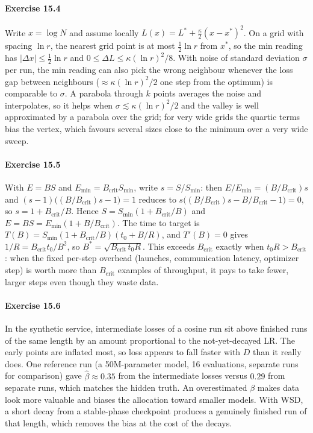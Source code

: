 \paragraph{Exercise 15.4} Write $x=\log N$ and assume locally $L(x)=L^*+\tfrac\kappa2(x-x^*)^2$.
On a grid with spacing $\ln r$, the nearest grid point is at most $\tfrac12\ln r$ from $x^*$, so
the min reading has $|\Delta x|\le\tfrac12\ln r$ and $0\le\Delta L\le\kappa(\ln r)^2/8$. With
noise of standard deviation $\sigma$ per run, the min reading can also pick the wrong neighbour
whenever the loss gap between neighbours ($\approx\kappa(\ln r)^2/2$ one step from the optimum) is
comparable to $\sigma$. A parabola through $k$ points averages the noise and interpolates, so it
helps when $\sigma\lesssim\kappa(\ln r)^2/2$ and the valley is well approximated by a parabola over
the grid; for very wide grids the quartic terms bias the vertex, which favours several sizes close
to the minimum over a very wide sweep.

\paragraph{Exercise 15.5} With $E=BS$ and $E_{\min}=B_{\text{crit}}S_{\min}$, write
$s=S/S_{\min}$: then $E/E_{\min}=(B/B_{\text{crit}})s$ and
$(s-1)\bigl((B/B_{\text{crit}})s-1\bigr)=1$ reduces to
$s\bigl((B/B_{\text{crit}})s-B/B_{\text{crit}}-1\bigr)=0$, so $s=1+B_{\text{crit}}/B$. Hence
$S=S_{\min}(1+B_{\text{crit}}/B)$ and $E=BS=E_{\min}(1+B/B_{\text{crit}})$. The time to target is
$T(B)=S_{\min}(1+B_{\text{crit}}/B)(t_0+B/R)$, and $T'(B)=0$ gives $1/R=B_{\text{crit}}t_0/B^2$, so
$B^*=\sqrt{B_{\text{crit}}\,t_0R}$. This exceeds $B_{\text{crit}}$ exactly when $t_0R>B_{\text{crit}}$:
when the fixed per-step overhead (launches, communication latency, optimizer step) is worth more
than $B_{\text{crit}}$ examples of throughput, it pays to take fewer, larger steps even though they
waste data.

\paragraph{Exercise 15.6} In the synthetic service, intermediate losses of a cosine run sit above
finished runs of the same length by an amount proportional to the not-yet-decayed LR. The early
points are inflated most, so loss appears to fall faster with $D$ than it really does. One
reference run (a 50M-parameter model, 16 evaluations, separate runs for comparison) gave
$\hat\beta\approx0.35$ from the intermediate losses versus $0.29$ from separate runs, which matches
the hidden truth. An overestimated $\beta$ makes data look more valuable and biases the allocation
toward smaller models. With WSD, a short decay from a stable-phase checkpoint produces a
genuinely finished run of that length, which removes the bias at the cost of the decays.

